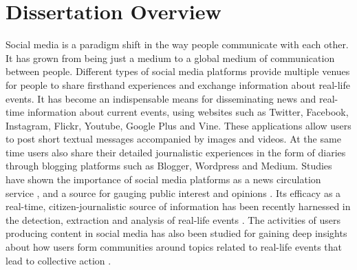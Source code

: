 
\chapter{Dissertation Overview} %

\label{overview} %

\doublespacing
\setlength{\parindent}{1cm}

Social media is a paradigm shift in the way people communicate with each other. It has grown from being just a medium to a global medium of communication between people. Different types of social media platforms provide multiple venues for people to share firsthand experiences and exchange information about real-life events. It has become an indispensable means for disseminating news and real-time information about current events, using websites such as Twitter, Facebook, Instagram, Flickr, Youtube, Google Plus and Vine. These applications allow users to post short textual messages accompanied by images and videos. At the same time users also share their detailed journalistic experiences in the form of diaries through blogging platforms such as Blogger, Wordpress and Medium. Studies have shown the importance of social media platforms as a news circulation service \cite{phelan2009using}, and a source for gauging public interest and opinions \cite{o2010tweets,singh2010clustering,singh2010mining,agarwal2012online}. Its efficacy as a real-time, citizen-journalistic source of information has been recently harnessed in the detection, extraction and analysis of real-life events \cite{sakaki2013tweet,popescu2011extracting,purohit2013twitris}. The activities of users producing content in social media has also been studied for gaining deep insights about how users form communities around topics related to real-life events \cite{agarwal2013grouping,agarwal2014time,sen2012identifying} that lead to collective action \cite{agarwal2014online,agarwal2012raising}.

